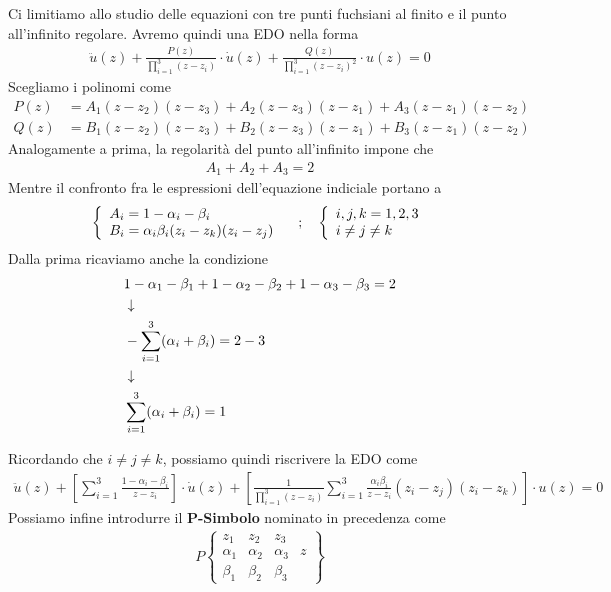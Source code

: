 \newpage
{}
Ci limitiamo allo studio delle equazioni con tre punti fuchsiani al finito e il punto all'infinito regolare. Avremo quindi una EDO nella forma
\begin{align}
	\ddot{u}(z) + \frac{P(z)}{\prod_{i=1}^3(z-z_i)}\cdot \dot{u}(z) + \frac{Q(z)}{\prod_{i=1}^3(z-z_i)^2} \cdot u(z)=0 
\end{align}
Scegliamo i polinomi come
\begin{align}
	P(z)&= A_1(z-z_2)(z-z_3) + A_2(z-z_3)(z-z_1) + A_3(z-z_1)(z-z_2)\\
	Q(z)&= B_1(z-z_2)(z-z_3) + B_2(z-z_3)(z-z_1) + B_3(z-z_1)(z-z_2)
\end{align}
Analogamente a prima, la regolarità del punto all'infinito impone che
\begin{align}
	A_1 + A_2 + A_3 = 2 
\end{align}
Mentre il confronto fra le espressioni dell'equazione indiciale portano a
\begin{align}
	\double{A_i = 1-\alpha_i - \beta_i\hfill}{B_i = \alpha_i\beta_i (z_i - z_k)(z_i - z_j)} \spacer \double{i,j,k = 1,2,3}{i\neq j \neq k\hfill}
\end{align}
Dalla prima ricaviamo anche la condizione
\begin{align}
	&1-\alpha_1 - \beta_1 + 1-\alpha_2 - \beta_2 + 1-\alpha_3 - \beta_3 = 2\\ &\downarrow \nonumber \\
	&-\sum_{i=1}^{3}(\alpha_i + \beta_i) = 2-3\nonumber \\ &\downarrow \nonumber \\
	&\sum_{i=1}^{3}(\alpha_i + \beta_i) = 1
\end{align}

Ricordando che $i\neq j \neq k$, possiamo quindi riscrivere la EDO come
\begin{align}
	\ddot{u}(z) + \left[\sum_{i=1}^3\frac{1-\alpha_i - \beta_i}{z-z_i}\right]\cdot \dot{u}(z) + \left[\frac{1}{\prod_{i=1}^3(z-z_i)}\sum_{i=1}^3\frac{\alpha_i\beta_i}{z-z_i}(z_i-z_j)(z_i-z_k)\right] \cdot u(z)=0
\end{align}
Possiamo infine introdurre il \textbf{P-Simbolo} nominato in precedenza come
\begin{align}
	P\left\{\begin{matrix}
		z_1 & z_2 & z_3 & \\
		\alpha_1 & \alpha_2 & \alpha_3& z\\
		\beta_1 & \beta_2 & \beta_3 & 
	\end{matrix}\right\}
\end{align}

